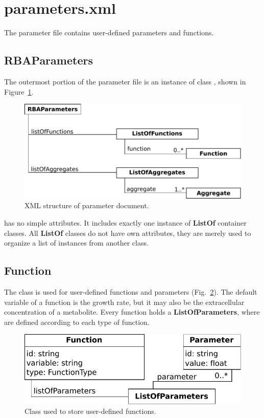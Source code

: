
\section{parameters.xml}

The parameter file contains user-defined parameters and functions.


\subsection{RBAParameters}
\label{sec:rba_parameters}

The outermost portion of the parameter file is an instance of class
\rbaparameters, shown in Figure~\ref{fig:parameters_doc}.

\begin{figure}
  \centering
  \includegraphics[scale=0.8]{figures/parameters_doc}
  \caption{XML structure of parameter document.}
\label{fig:parameters_doc}
\end{figure}

\rbaparameters{} has no simple attributes.
It includes exactly one instance of \textbf{ListOf} container classes.
All \textbf{ListOf} classes do not have own attributes,
they are merely used to organize a list of instances from another class.

\subsection{Function}
\label{sec:function}

The \function{} class is used for user-defined functions and parameters
(Fig.~\ref{fig:parameters_function}).
The default variable of a function is the growth rate, but it may also be
the extracellular concentration of a metabolite.
Every function holds a \textbf{ListOfParameters},
where \parameter{} are defined according to each type of function.

\begin{figure}
  \centering
  \includegraphics[scale=0.8]{figures/parameters_function}
  \caption{Class used to store user-defined functions.}
\label{fig:parameters_function}
\end{figure}

